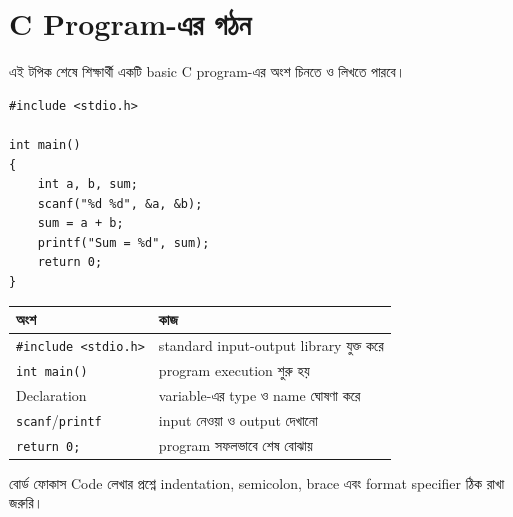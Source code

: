 \section{C Program-এর গঠন}

\begin{learningbox}
এই টপিক শেষে শিক্ষার্থী একটি basic C program-এর অংশ চিনতে ও লিখতে পারবে।
\end{learningbox}

\begin{verbatim}
#include <stdio.h>

int main()
{
    int a, b, sum;
    scanf("%d %d", &a, &b);
    sum = a + b;
    printf("Sum = %d", sum);
    return 0;
}
\end{verbatim}

\begin{center}
\begin{tabular}{|p{}|p{}|}
\hline
\textbf{অংশ} & \textbf{কাজ} \\
\hline
\texttt{\#include <stdio.h>} & standard input-output library যুক্ত করে \\
\hline
\texttt{int main()} & program execution শুরু হয় \\
\hline
Declaration & variable-এর type ও name ঘোষণা করে \\
\hline
\texttt{scanf}/\texttt{printf} & input নেওয়া ও output দেখানো \\
\hline
\texttt{return 0;} & program সফলভাবে শেষ বোঝায় \\
\hline
\end{tabular}
\end{center}

\begin{boardbox}{বোর্ড ফোকাস}
Code লেখার প্রশ্নে indentation, semicolon, brace এবং format specifier ঠিক রাখা জরুরি।
\end{boardbox}

